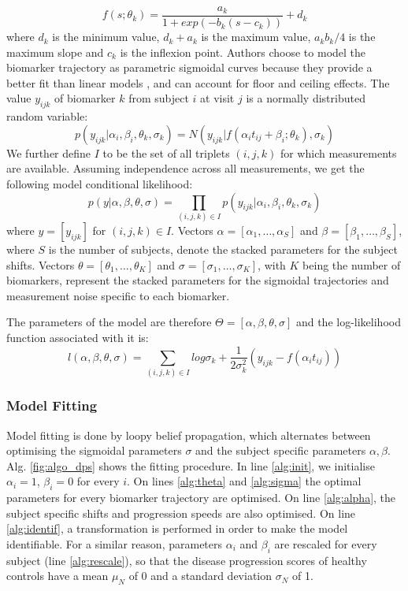 \begin{equation}
 f(s;\theta_k) = \frac{a_k}{1+exp(-b_k(s-c_k))} + d_k
\end{equation}
where $d_k$ is the minimum value, $d_k+a_k$ is the maximum value, $a_kb_k/4$ is the maximum slope and $c_k$ is the inflexion point. Authors choose to model the biomarker trajectory as parametric sigmoidal curves because they provide a better fit than linear models \cite{sabuncu2011dynamics, caroli2010dynamics}, and can account for floor and ceiling effects. The value $y_{ijk}$ of biomarker $k$ from subject $i$ at visit $j$ is a normally distributed random variable:
\begin{equation}
 p(y_{ijk} | \alpha_i, \beta_i, \theta_k, \sigma_k) = N(y_{ijk} | f(\alpha_i t_{ij} + \beta_i; \theta_k), \sigma_k )
\end{equation}
We further define $I$ to be the set of all triplets $(i,j,k)$ for which measurements are available. Assuming independence across all measurements, we get the following model conditional likelihood:
\begin{equation}
 p(y | \alpha, \beta, \theta, \sigma) = \prod_{(i,j,k) \in I} p(y_{ijk} | \alpha_i, \beta_i, \theta_k, \sigma_k)
\end{equation}
where $y = [y_{ijk}]$ for $(i,j,k) \in I$. Vectors $\alpha = [\alpha_1, \dots, \alpha_S]$ and $\beta = [\beta_1, \dots, \beta_S]$, where $S$ is the number of subjects, denote the stacked parameters for the subject shifts. Vectors $\theta = [\theta_1, \dots, \theta_K]$ and $\sigma = [\sigma_1, \dots, \sigma_K]$, with $K$ being the number of biomarkers, represent the stacked parameters for the sigmoidal trajectories and measurement noise specific to each biomarker.

The parameters of the model are therefore $\Theta = [\alpha, \beta, \theta, \sigma]$ and the log-likelihood function associated with it is:
\begin{equation}
 l(\alpha, \beta, \theta, \sigma) = \sum_{(i,j,k) \in I} log \sigma_k + \frac{1}{2 \sigma_k ^2} \left( y_{ijk} - f(\alpha_i t_{ij})\right)
\end{equation}

\subsubsection{Model Fitting}

Model fitting is done by loopy belief propagation, which alternates between optimising the sigmoidal parameters $\sigma$ and the subject specific parameters $\alpha, \beta$. Alg. \ref{fig:algo_dps} shows the fitting procedure. In line \ref{alg:init}, we initialise $\alpha_i = 1$, $\beta_i = 0$ for every $i$. On lines \ref{alg:theta} and \ref{alg:sigma} the optimal parameters for every biomarker trajectory are optimised. On line \ref{alg:alpha}, the subject specific shifts and progression speeds are also optimised. On line \ref{alg:identif}, a transformation is performed in order to make the model identifiable. For a similar reason, parameters $\alpha_i$ and $\beta_i$ are rescaled for every subject (line \ref{alg:rescale}), so that the disease progression scores of healthy controls have a mean $\mu_N$ of 0 and a standard deviation $\sigma_N$ of 1.

